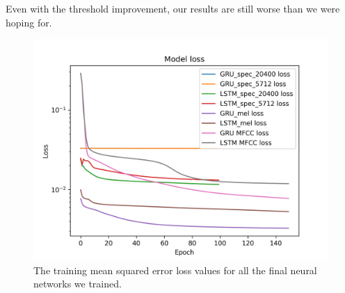 Even with the threshold improvement, our results are still worse than we were hoping for. 
\begin{figure}[hbt!]
    \centering
	\includegraphics[width=120mm]{./img/all_training_graphs.png}
	\caption{The training mean squared error loss values for all the final neural networks we trained.}
	\label{fig:all_model_training}
\end{figure}